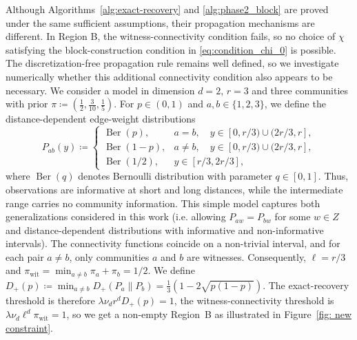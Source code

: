 \documentclass[11pt, a4paper]{amsart}
\newcommand{\1}{\mathbf{1}}
\theoremstyle{definition}
\theoremstyle{remark}
\theoremstyle{definition}
\begin{document}
Although Algorithms~\ref{alg:exact-recovery} and
\ref{alg:phase2_block} are proved under the same sufficient assumptions,
their propagation mechanisms are different.
In Region B, the witness-connectivity condition fails, so no choice of $\chi$ satisfying the block-construction condition in \eqref{eq:condition_chi_0} is possible.
The discretization-free propagation rule remains well defined, so 
we investigate numerically whether this additional connectivity condition also appears to be necessary.
We consider a model in dimension $d=2$, $r=3$ and three communities with prior $\pi \coloneqq \left(\tfrac12,\tfrac3{10},\tfrac15\right)$. For $p\in(0,1)$ and $a,b \in\{1,2,3\}$, we define the distance-dependent edge-weight distributions
\begin{equation}
\label{eq:numerical-model}
P_{ab}(y)\coloneqq 
\begin{cases}
\operatorname{Ber}(p),
& a=b,\quad y\in[0,r/3)\cup(2r/3,r],\\
\operatorname{Ber}(1-p),
& a\neq b,\quad y\in[0,r/3)\cup(2r/3,r],\\
\operatorname{Ber}(1/2),
& y\in[r/3,2r/3],
\end{cases}
\end{equation}
where $\operatorname{Ber}(q)$ denotes Bernoulli distribution with parameter $q\in [0,1]$. Thus, observations are informative at short and long distances, while the intermediate range carries no community information.
This simple model captures both generalizations considered in this work (i.e. allowing $P_{aw}=P_{bw}$ for some $w \in Z$ and distance-dependent distributions with informative and non-informative intervals).
The connectivity functions coincide on a non-trivial interval, and for each
pair $a\neq b$, only communities $a$ and $b$ are witnesses.
Consequently, $\ell=r/3$ and $\pi_{\mathrm{wit}}=\min_{a\neq b}\pi_a+\pi_b=1/2$. 
We define $D_+(p) \coloneqq \min_{a\neq b}D_+(P_a\|P_b) = \tfrac13\left(1-2\sqrt{p(1-p)}\right)$. The exact-recovery threshold is therefore
$\lambda\nu_d r^dD_+(p)=1$, the witness-connectivity threshold is $\lambda\nu_d\ell^d\pi_{\mathrm{wit}}=1$, so we get a non-empty Region~B as illustrated in Figure~\ref{fig: new constraint}.
\end{document}
